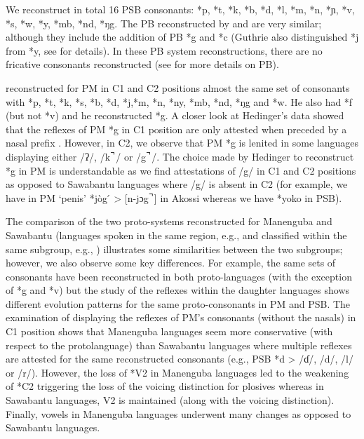 \documentclass[output=paper,colorlinks,citecolor=brown
]{langscibook}
\begin{document}
We reconstruct in total 16 PSB consonants: *p, *t, *k, *b, *d, *l, *m, *n, *ɲ, *v, *s, *w, *y, *mb, *nd, *ŋg. The PB reconstructed by \citet{guthriecomparativebantu} and \citet{meeussen1967} are very similar; although they include the addition of PB *g and *c (Guthrie also distinguished *j from *y, see \citealt{wills2022} for details). In these PB system reconstructions, there are no fricative consonants reconstructed (see \citealt{bostoen2019handbook} for more details on PB). 

\largerpage
\citet{hedinger1987} reconstructed for PM in C1 and C2 positions almost the same set of consonants with *p, *t, *k, *s, *b, *d, *j,*m, *n, *ny, *mb, *nd, *ŋg and *w. He also had *f (but not *v) and he reconstructed *g. A closer look at Hedinger’s data showed that the reflexes of PM *g in C1 position are only attested when preceded by a nasal prefix \citep[39]{hedinger1987}. However, in C2, we observe that PM *g is lenited in some languages displaying either /ʔ/, /k ̚ / or /g ̚ /. The choice made by Hedinger to reconstruct *g in PM is understandable as we find attestations of /g/ in C1 and C2 positions as opposed to Sawabantu languages where /g/ is absent in C2 (for example, we have in PM `penis' *jòg ́ > [n-jɔg ̚ ] in Akossi whereas we have *yoko in PSB). 

The comparison of the two proto-systems reconstructed for Manenguba and Sawabantu (languages spoken in the same region, e.g.,  and classified within the same subgroup, e.g., ) illustrates some similarities between the two subgroups; however, we also observe some key differences. For example, the same sets of consonants have been reconstructed in both proto-languages (with the exception of *g and *v) but the study of the reflexes within the daughter languages shows different evolution patterns for the same proto-consonants in PM and PSB. The examination of  displaying the reflexes of PM’s consonants (without the nasals) in C1 position shows that Manenguba languages seem more conservative (with respect to the protolanguage) than Sawabantu languages where multiple reflexes are attested for the same reconstructed consonants (e.g., PSB *d > /ɗ/, /d/, /l/ or /r/). However, the loss of *V2 in Manenguba languages led to the weakening of *C2 triggering the loss of the voicing distinction for plosives whereas in Sawabantu languages, V2 is maintained (along with the voicing distinction). Finally, vowels in Manenguba languages underwent many changes \citep[44-45]{hedinger1987} as opposed to Sawabantu languages. 
\end{document}
